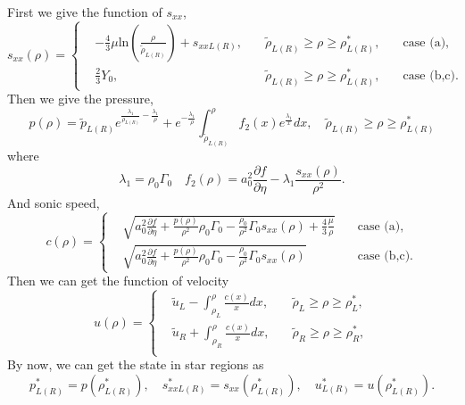 \documentclass[review]{elsarticle}
\begin{document}
First we give the function of $s_{xx}$,
\begin{equation}
  s_{xx}(\rho) = \left\{\begin{aligned}
	  & -\frac{4}{3}\mu\text{ln}\left(\frac{\rho}{\tilde{\rho}_{L(R)}}\right)+s_{xxL(R)}, \quad & \tilde{\rho}_{L(R)} \ge \rho \ge \rho_{L(R)}^*,  \quad &\text{case (a)},\\
	  & \frac{2}{3}Y_0,  \quad & \tilde{\rho}_{L(R)} \ge \rho \ge \rho_{L(R)}^*,  \quad &\text{case (b,c)}.
  \end{aligned} \right.
  \end{equation}
Then we give the pressure,
\begin{equation}
  p(\rho)=\tilde{p}_{L(R)}e^{\frac{\lambda_1}{\rho_{L(R)}}-\frac{\lambda_1}{\rho}} +e^{-\frac{\lambda_1}{\rho}}\int_{\tilde{\rho}_{L(R)}}^{\rho} f_2(x) e^{\frac{\lambda_1}{x}}dx, \quad   \tilde{\rho}_{L(R)} \ge \rho \ge \rho_{L(R)}^*
\end{equation}
where 
\begin{equation}
  \lambda_1 = \rho_0 \Gamma_0 \quad f_2(\rho) = a_0^2\frac{\partial f}{\partial \eta}- \lambda_1\frac{s_{xx}(\rho)}{\rho^2}.
\end{equation}
And sonic speed,
\begin{equation}
  c(\rho) = \left\{ \begin{aligned}
	&  \sqrt{a_0^2 \frac{\partial f}{\partial \eta} + \frac{p(\rho)}{\rho^2}\rho_0\Gamma_0 -\frac{\rho_0}{\rho^2}\Gamma_0 s_{xx}(\rho) +\frac{4}{3}\frac{\mu}{\rho}} \quad & \text{case (a)},\\
	&	\sqrt{a_0^2 \frac{\partial f}{\partial \eta} + \frac{p(\rho)}{\rho^2}\rho_0\Gamma_0 -\frac{\rho_0}{\rho^2}\Gamma_0 s_{xx}(\rho)}  \quad  & \text{case (b,c)}.
	\end{aligned}\right.
\end{equation}
Then we can get  the  function of  velocity
\begin{equation}
  u(\rho) =\left\{ \begin{aligned} 
	  &\tilde{u}_L - \int_{\rho_L}^{\rho} \frac{c(x)}{x} dx, \quad  & \tilde{\rho}_L \ge \rho \ge \rho_L^*,   \\
	  &\tilde{u}_R + \int_{\rho_R}^{\rho} \frac{c(x)}{x} dx, \quad  & \tilde{\rho}_R \ge \rho \ge \rho_R^*, \\
	\end{aligned}
  \right.
\end{equation}
By now, we can get the state in star regions as
\begin{equation}
  p^*_{L(R)} = p(\rho_{L(R)}^*),\quad s_{xxL(R)}^* = s_{xx}(\rho_{L(R)}^*),\quad  u^*_{L(R)} = u(\rho_{L(R)}^*).
\end{equation}
\end{document}
